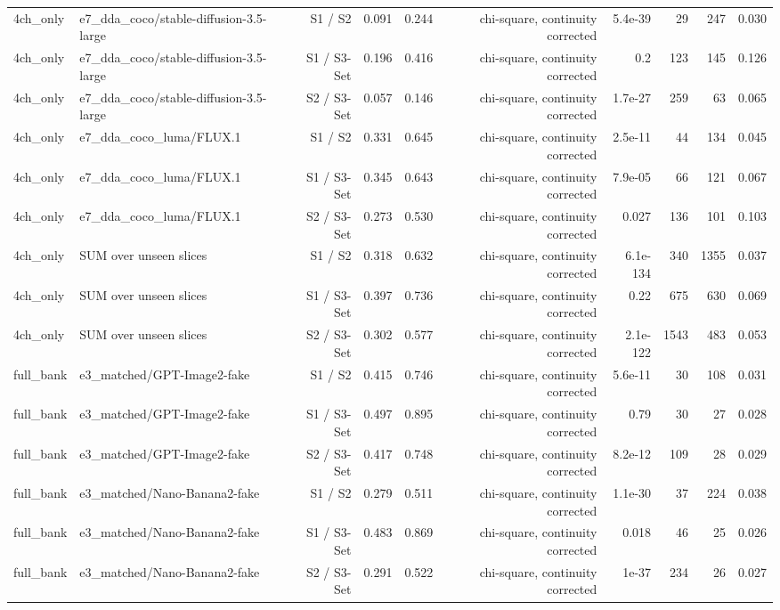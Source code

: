 \begin{table}[htbp]
\begin{tabular}{llrrrrrrrr}
4ch\_only & e7\_dda\_coco/stable-diffusion-3.5-large & S1 / S2 & 0.091 & 0.244 & chi-square, continuity corrected & 5.4e-39 & 29 & 247 & 0.030 \\
4ch\_only & e7\_dda\_coco/stable-diffusion-3.5-large & S1 / S3-Set & 0.196 & 0.416 & chi-square, continuity corrected & 0.2 & 123 & 145 & 0.126 \\
4ch\_only & e7\_dda\_coco/stable-diffusion-3.5-large & S2 / S3-Set & 0.057 & 0.146 & chi-square, continuity corrected & 1.7e-27 & 259 & 63 & 0.065 \\
4ch\_only & e7\_dda\_coco\_luma/FLUX.1 & S1 / S2 & 0.331 & 0.645 & chi-square, continuity corrected & 2.5e-11 & 44 & 134 & 0.045 \\
4ch\_only & e7\_dda\_coco\_luma/FLUX.1 & S1 / S3-Set & 0.345 & 0.643 & chi-square, continuity corrected & 7.9e-05 & 66 & 121 & 0.067 \\
4ch\_only & e7\_dda\_coco\_luma/FLUX.1 & S2 / S3-Set & 0.273 & 0.530 & chi-square, continuity corrected & 0.027 & 136 & 101 & 0.103 \\
4ch\_only & SUM over unseen slices & S1 / S2 & 0.318 & 0.632 & chi-square, continuity corrected & 6.1e-134 & 340 & 1355 & 0.037 \\
4ch\_only & SUM over unseen slices & S1 / S3-Set & 0.397 & 0.736 & chi-square, continuity corrected & 0.22 & 675 & 630 & 0.069 \\
4ch\_only & SUM over unseen slices & S2 / S3-Set & 0.302 & 0.577 & chi-square, continuity corrected & 2.1e-122 & 1543 & 483 & 0.053 \\
full\_bank & e3\_matched/GPT-Image2-fake & S1 / S2 & 0.415 & 0.746 & chi-square, continuity corrected & 5.6e-11 & 30 & 108 & 0.031 \\
full\_bank & e3\_matched/GPT-Image2-fake & S1 / S3-Set & 0.497 & 0.895 & chi-square, continuity corrected & 0.79 & 30 & 27 & 0.028 \\
full\_bank & e3\_matched/GPT-Image2-fake & S2 / S3-Set & 0.417 & 0.748 & chi-square, continuity corrected & 8.2e-12 & 109 & 28 & 0.029 \\
full\_bank & e3\_matched/Nano-Banana2-fake & S1 / S2 & 0.279 & 0.511 & chi-square, continuity corrected & 1.1e-30 & 37 & 224 & 0.038 \\
full\_bank & e3\_matched/Nano-Banana2-fake & S1 / S3-Set & 0.483 & 0.869 & chi-square, continuity corrected & 0.018 & 46 & 25 & 0.026 \\
full\_bank & e3\_matched/Nano-Banana2-fake & S2 / S3-Set & 0.291 & 0.522 & chi-square, continuity corrected & 1e-37 & 234 & 26 & 0.027 \\

\end{tabular}
\end{table}

